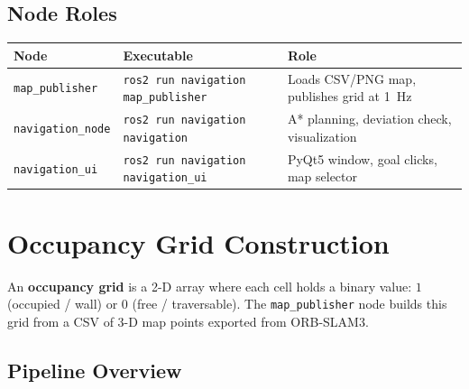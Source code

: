 \documentclass[12pt,a4paper]{article}
\begin{document}
\subsection{Node Roles}

\begin{center}
\begin{tabular}{lll}
\toprule
\textbf{Node} & \textbf{Executable} & \textbf{Role} \\
\midrule
\texttt{map\_publisher} & \texttt{ros2 run navigation map\_publisher} & Loads CSV/PNG map, publishes grid at 1~Hz \\
\texttt{navigation\_node} & \texttt{ros2 run navigation navigation} & A* planning, deviation check, visualization \\
\texttt{navigation\_ui} & \texttt{ros2 run navigation navigation\_ui} & PyQt5 window, goal clicks, map selector \\
\bottomrule
\end{tabular}
\end{center}

\section{Occupancy Grid Construction}

An \textbf{occupancy grid} is a 2-D array where each cell holds a binary
value: \(1\) (occupied / wall) or \(0\) (free / traversable).
The \texttt{map\_publisher} node builds this grid from a CSV of 3-D map points
exported from ORB-SLAM3.

\subsection{Pipeline Overview}

\begin{center}
\end{center}
\end{document}

